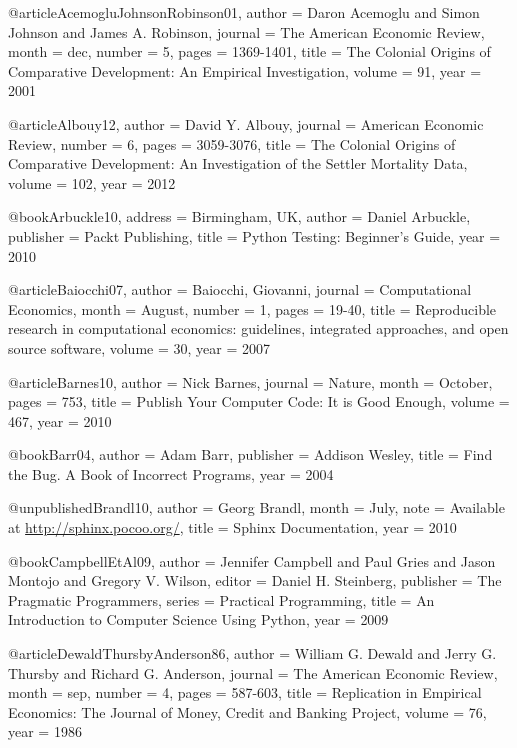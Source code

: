 
@article{AcemogluJohnsonRobinson01,
author  = {Daron Acemoglu and Simon Johnson and James A. Robinson},
journal = {The American Economic Review},
month   = dec,
number  = {5},
pages   = {1369-1401},
title   = {The Colonial Origins of Comparative Development: An Empirical Investigation},
volume  = {91},
year    = {2001}
}

@article{Albouy12,
author  = {David Y. Albouy},
journal = {American Economic Review},
number  = {6},
pages   = {3059-3076},
title   = {The Colonial Origins of Comparative Development: An Investigation of the Settler Mortality Data},
volume  = {102},
year    = {2012}
}

@book{Arbuckle10,
address   = {Birmingham, UK},
author    = {Daniel Arbuckle},
publisher = {Packt Publishing},
title     = {Python Testing: Beginner's Guide},
year      = {2010}
}

@article{Baiocchi07,
author  = {Baiocchi, Giovanni},
journal = {Computational Economics},
month   = {August},
number  = {1},
pages   = {19-40},
title   = {Reproducible research in computational economics: guidelines, integrated approaches, and open source software},
volume  = {30},
year    = {2007}
}

@article{Barnes10,
author  = {Nick Barnes},
journal = {Nature},
month   = {October},
pages   = {753},
title   = {Publish Your Computer Code: It is Good Enough},
volume  = {467},
year    = {2010}
}

@book{Barr04,
author    = {Adam Barr},
publisher = {Addison Wesley},
title     = {Find the Bug. A Book of Incorrect Programs},
year      = {2004}
}

@unpublished{Brandl10,
author = {Georg Brandl},
month  = {July},
note   = {Available at \url{http://sphinx.pocoo.org/}},
title  = {Sphinx Documentation},
year   = {2010}
}

@book{CampbellEtAl09,
author    = {Jennifer Campbell and Paul Gries and Jason Montojo and Gregory V. Wilson},
editor    = {Daniel H. Steinberg},
publisher = {The Pragmatic Programmers},
series    = {Practical Programming},
title     = {An Introduction to Computer Science Using {Python}},
year      = {2009}
}

@article{DewaldThursbyAnderson86,
author  = {William G. Dewald and Jerry G. Thursby and Richard G. Anderson},
journal = {The American Economic Review},
month   = sep,
number  = {4},
pages   = {587-603},
title   = {Replication in Empirical Economics: The Journal of Money, Credit and Banking Project},
volume  = {76},
year    = {1986}
}

